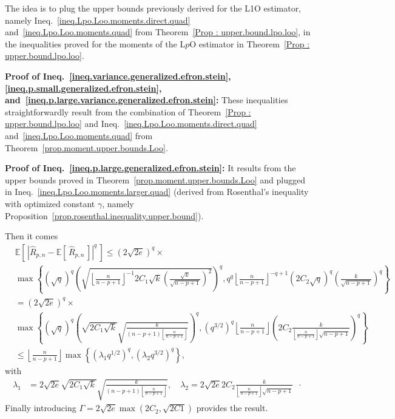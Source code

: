 \documentclass[twoside,11pt]{article}
\numberwithin{equation}{section}
\newcommand{\floor}[1]{\left\lfloor #1 \right\rfloor}
\newcommand{\1}{\mathds{1}}%
\newcommand{\paren}[1]{\left( #1 \right)}
\newcommand{\croch}[1]{\left[\, #1 \,\right]}
\newcommand{\acc}[1]{\left\{ #1 \right\}}
\newcommand{\abs}[1]{\left\lvert #1 \right\rvert} %
\newcommand{\E}{\mathbb{E}}
\newcommand{\Rh}{\widehat{R}}
\numberwithin{equation}{section}
\theoremstyle{plain}
\begin{document}
The idea is to plug the upper bounds previously derived for the L1O estimator, namely Ineq.~\eqref{ineq.Lpo.Loo.moments.direct.quad} and~\eqref{ineq.Lpo.Loo.moments.quad} from Theorem~\ref{Prop : upper.bound.lpo.loo}, in the inequalities proved for the moments of the L$p$O estimator in Theorem~\ref{Prop : upper.bound.lpo.loo}.


\bigskip


\noindent\textbf{Proof of  Ineq.~\eqref{ineq.variance.generalized.efron.stein}, \eqref{ineq.p.small.generalized.efron.stein}, and~\eqref{ineq.p.large.variance.generalized.efron.stein}:}
%
These inequalities straightforwardly result from the combination of Theorem~\ref{Prop : upper.bound.lpo.loo} and Ineq.~\eqref{ineq.Lpo.Loo.moments.direct.quad} and~\eqref{ineq.Lpo.Loo.moments.quad} from Theorem~\ref{prop.moment.upper.bounds.Loo}.

\bigskip

\noindent\textbf{Proof of Ineq.~\eqref{ineq.p.large.generalized.efron.stein}:}
%
It results from the upper bounds proved in Theorem~\ref{prop.moment.upper.bounds.Loo} and plugged in Ineq.~\eqref{ineq.Lpo.Loo.moments.larger.quad} (derived from Rosenthal's inequality with optimized constant $\gamma$, namely Proposition~\ref{prop.rosenthal.inequality.upper.bound}).

Then it comes
%
{\small
\begin{align*}
&\E\croch{ \abs{ \Rh_{p,n} - \E\croch{\Rh_{p,n}} }^{q} }
 \leq  \paren{2\sqrt{2e}}^q \times \\
%
 & \max\acc{ \paren{\sqrt{q}}^q \paren{ \sqrt{ \floor{\frac{n}{n-p+1}}^{-1} 2C_1  \sqrt{k} \paren{\frac{ \sqrt{k}}{\sqrt{n-p+1}}}^2 }}^q ,  q^q \floor{\frac{n}{n-p+1}}^{-q+1} (2C_2\sqrt{q})^{q} \paren{ \frac{k}{\sqrt{n-p+1}}}^q  } \\
%
& =  \paren{2\sqrt{2e}}^q \times \\
& \max \acc{ \paren{\sqrt{q}}^q \paren{ \sqrt{  2C_1  \sqrt{k} } \sqrt{ \frac{k}{\paren{n-p+1}\floor{\frac{n}{n-p+1}} } } }^q ,  \paren{q^{3/2} }^q \floor{\frac{n}{n-p+1}}  \paren{ 2C_2\frac{k}{\floor{\frac{n}{n-p+1}}\sqrt{n-p+1}} }^q  } \\
%
& \leq \floor{\frac{n}{n-p+1}} \max\acc{ \paren{ \lambda_1 q^{1/2} }^q , \paren{ \lambda_2 q^{3/2} }^q } ,
\end{align*}}
with
\begin{align*}
  \lambda_1 & =  2\sqrt{2e}   \sqrt{  2C_1  \sqrt{k} } \sqrt{ \frac{k}{\paren{n-p+1}\floor{\frac{n}{n-p+1}} } } , \quad
%
\lambda_2  =   2\sqrt{2e } 2C_2\frac{k}{\floor{\frac{n}{n-p+1}}\sqrt{n-p+1}} \enspace\cdot
\end{align*}
%
Finally introducing $\Gamma = 2\sqrt{2e } \max\paren{2C_2,\sqrt{2C1}}$ provides the result.
\end{document}
